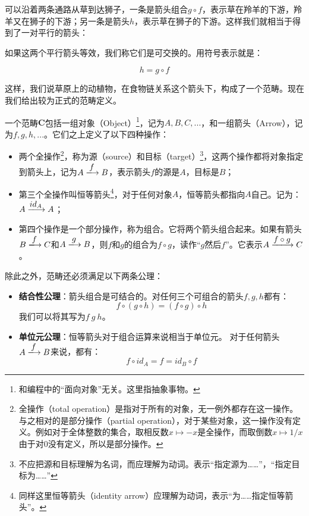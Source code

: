 \documentclass[b5paper]{ctexart}
\begin{document}
可以沿着两条通路从草到达狮子，一条是箭头组合$g \circ f$，表示草在羚羊的下游，羚羊又在狮子的下游；另一条是箭头$h$，表示草在狮子的下游。这样我们就相当于得到了一对平行的箭头：

\begin{center}
\end{center}

如果这两个平行箭头等效，我们称它们是可交换的。用符号表示就是：

\[
h = g \circ f
\]

这样，我们说草原上的动植物，在食物链关系这个箭头下，构成了一个范畴。现在我们给出较为正式的范畴定义。

 
\begin{definition}
一个范畴$\pmb{C}$包括一组对象（Object）\footnote{和编程中的“面向对象”无关。这里指抽象事物。}，记为$A, B, C, ...$，和一组箭头（Arrow），记为$f, g, h, ...$。它们之上定义了以下四种操作：
\begin{itemize}
\item 两个全操作\footnote{全操作（total operation）是指对于所有的对象，无一例外都存在这一操作。与之相对的是部分操作（partial operation），对于某些对象，这一操作没有定义。例如对于全体整数的集合，取相反数$x \mapsto -x$是全操作，而取倒数$x \mapsto 1/x$由于对0没有定义，所以是部分操作。}，称为源（source）和目标（target）\footnote{不应把源和目标理解为名词，而应理解为动词。表示“指定源为……”，“指定目标为……”}，这两个操作都将对象指定到箭头上，记为$A \arrowto{f} B$，表示箭头$f$的源是$A$，目标是$B$；
\item 第三个全操作叫恒等箭头\footnote{同样这里恒等箭头（identity arrow）应理解为动词，表示“为……指定恒等箭头”。}，对于任何对象$A$，恒等箭头都指向$A$自己。记为：$A \arrowto{id_A} A$；
\item 第四个操作是一个部分操作，称为组合。它将两个箭头组合起来。如果有箭头$B \arrowto{f} C$和$A \arrowto{g} B$，则$f$和$g$的组合为$f \circ g$，读作“$g$然后$f$”。它表示$A \arrowto{f \circ g} C$。
\end{itemize}

除此之外，范畴还必须满足以下两条公理：

\begin{itemize}
\item \textbf{结合性公理}：箭头组合是可结合的。对任何三个可组合的箭头$f, g, h$都有：
\[
f \circ (g \circ h) = (f \circ g) \circ h
\]
我们可以将其写为$f\ g\ h$。
\item \textbf{单位元公理}：恒等箭头对于组合运算来说相当于单位元。
对于任何箭头$A \arrowto{f} B$来说，都有：
\[
f \circ id_A = f = id_B \circ f
\]
\end{itemize}
\end{definition}
\end{document}
